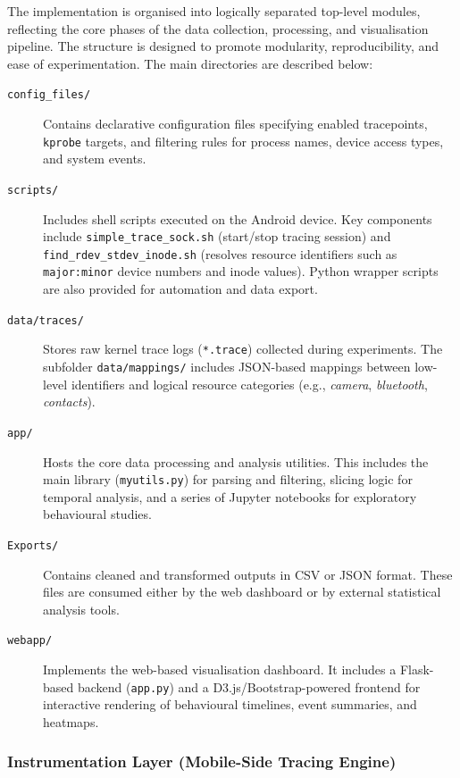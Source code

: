 \documentclass[a4paper,12pt]{report}
\begin{document}
The implementation is organised into logically separated top-level modules, reflecting the core phases of the data collection, processing, and visualisation pipeline. The structure is designed to promote modularity, reproducibility, and ease of experimentation. The main directories are described below:

\begin{description}
  \item[\texttt{config\_files/}] Contains declarative configuration files specifying enabled tracepoints, \texttt{kprobe} targets, and filtering rules for process names, device access types, and system events.

  \item[\texttt{scripts/}] Includes shell scripts executed on the Android device. Key components include \texttt{simple\_trace\_sock.sh} (start/stop tracing session) and \texttt{find\_rdev\_stdev\_inode.sh} (resolves resource identifiers such as \texttt{major:minor} device numbers and inode values). Python wrapper scripts are also provided for automation and data export.

  \item[\texttt{data/traces/}] Stores raw kernel trace logs (\texttt{*.trace}) collected during experiments. The subfolder \texttt{data/mappings/} includes JSON-based mappings between low-level identifiers and logical resource categories (e.g., \emph{camera}, \emph{bluetooth}, \emph{contacts}).

  \item[\texttt{app/}] Hosts the core data processing and analysis utilities. This includes the main library (\texttt{myutils.py}) for parsing and filtering, slicing logic for temporal analysis, and a series of Jupyter notebooks for exploratory behavioural studies.

  \item[\texttt{Exports/}] Contains cleaned and transformed outputs in CSV or JSON format. These files are consumed either by the web dashboard or by external statistical analysis tools.

  \item[\texttt{webapp/}] Implements the web-based visualisation dashboard. It includes a Flask-based backend (\texttt{app.py}) and a D3.js/Bootstrap-powered frontend for interactive rendering of behavioural timelines, event summaries, and heatmaps.
\end{description}


\subsubsection{Instrumentation Layer (Mobile-Side Tracing Engine)}
\end{document}
